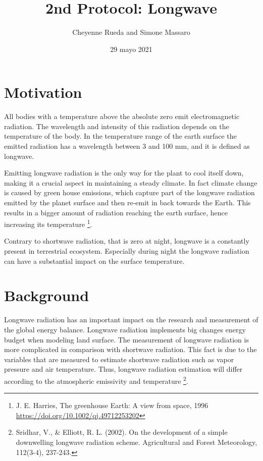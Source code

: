 \documentclass[
]{article}
\title{2nd Protocol: Longwave}
\author{Cheyenne Rueda and Simone Massaro}
\date{29 mayo 2021}
\begin{document}
\maketitle

{
\setcounter{tocdepth}{2}
\tableofcontents
}
\newpage

\hypertarget{motivation}{%
\section{Motivation}\label{motivation}}

All bodies with a temperature above the absolute zero emit
electromagnetic radiation. The wavelength and intensity of this
radiation depends on the temperature of the body. In the temperature
range of the earth surface the emitted radiation has a wavelength
between 3 and 100 mm, and it is defined as longwave.

Emitting longwave radiation is the only way for the plant to cool itself
down, making it a crucial aspect in maintaining a steady climate. In
fact climate change is caused by green house emissions, which capture
part of the longwave radiation emitted by the planet surface and then
re-emit in back towards the Earth. This results in a bigger amount of
radiation reaching the earth surface, hence increasing its temperature
\footnote{J. E. Harries, The greenhouse Earth: A view from space, 1996
  \url{https://doi.org/10.1002/qj.49712253202}}.

Contrary to shortwave radiation, that is zero at night, longwave is a
constantly present in terrestrial ecosystem. Especially during night the
longwave radiation can have a substantial impact on the surface
temperature.

\hypertarget{background}{%
\section{Background}\label{background}}

Longwave radiation has an important impact on the research and
measurement of the global energy balance. Longwave radiation implements
big changes energy budget when modeling land surface. The measurement of
longwave radiation is more complicated in comparison with shortwave
radiation. This fact is due to the variables that are measured to
estimate shortwave radiation such as vapor pressure and air temperature.
Thus, longwave radiation estimation will differ according to the
atmospheric emissivity and temperature \footnote{Sridhar, V., \&
  Elliott, R. L. (2002). On the development of a simple downwelling
  longwave radiation scheme. Agricultural and Forest Meteorology,
  112(3-4), 237-243.}.
\end{document}
